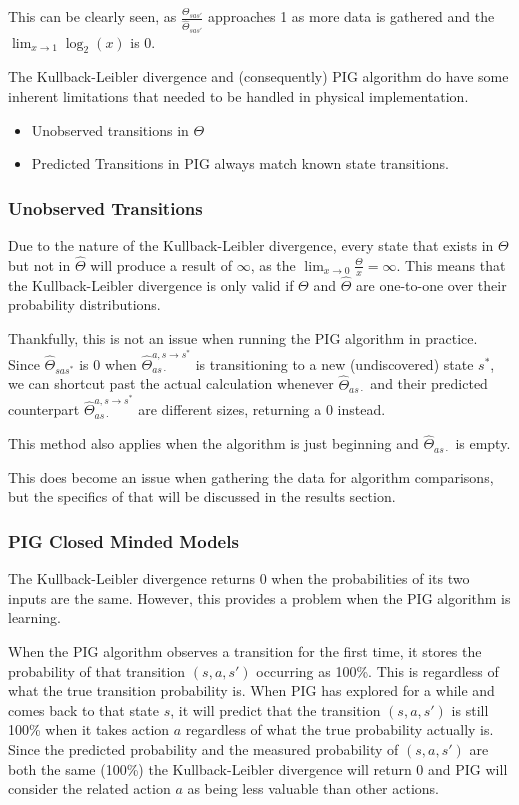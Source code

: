 \documentclass[12pt]{thesis}
\begin{document}
This can be clearly seen, as $\frac{\Theta_{sas'}}{\hat{\Theta}_{sas'}}$ approaches 1 as more data is gathered and the $\lim_{x \rightarrow 1} \log_{2}(x)$ is 0.

The Kullback-Leibler divergence and (consequently) PIG algorithm do have some inherent limitations that needed to be handled in physical implementation.
\begin{itemize}
	\item Unobserved transitions in $\Theta$
	\item Predicted Transitions in PIG always match known state transitions.
\end{itemize}

\subsubsection{Unobserved Transitions}
Due to the nature of the Kullback-Leibler divergence, every state that exists in $\Theta$ but not in $\hat{\Theta}$ will produce a result of $\infty$, as the $\lim_{x \rightarrow 0} \frac{\Theta}{x} = \infty$. This means that the Kullback-Leibler divergence is only valid if $\Theta$ and $\hat{\Theta}$ are one-to-one over their probability distributions.

Thankfully, this is not an issue when running the PIG algorithm in practice. Since $\hat{\Theta}_{sas^{*}}$ is 0 when $\hat{\Theta}_{as\cdot}^{a,s \rightarrow s^{*}}$ is transitioning to a new (undiscovered) state $s^{*}$, we can shortcut past the actual calculation whenever  $\hat{\Theta}_{as\cdot}$ and their predicted counterpart $\hat{\Theta}_{as\cdot}^{a,s \rightarrow s^{*}}$ are different sizes, returning a 0 instead.

This method also applies when the algorithm is just beginning and $\hat{\Theta}_{as\cdot}$ is empty.

This does become an issue when gathering the data for algorithm comparisons, but the specifics of that will be discussed in the results section.

\subsubsection{PIG Closed Minded Models}
The Kullback-Leibler divergence returns 0 when the probabilities of its two inputs are the same. However, this provides a problem when the PIG algorithm is learning.

When the PIG algorithm observes a transition for the first time, it stores the probability of that transition $(s,a,s')$ occurring as 100\%. This is regardless of what the true transition probability is. When PIG has explored for a while and comes back to that state $s$, it will predict that the transition $(s,a,s')$ is still 100\% when it takes action $a$ regardless of what the true probability actually is. Since the predicted probability and the measured probability of $(s,a,s')$ are both the same (100\%) the Kullback-Leibler divergence will return 0 and PIG will consider the related action $a$ as being less valuable than other actions.
\end{document}
